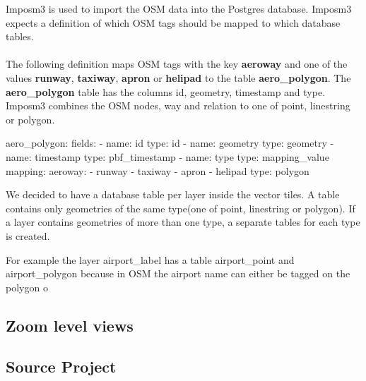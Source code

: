 Imposm3 is used to import the OSM data into the Postgres database. Imposm3 expects a definition of which OSM tags should be mapped to which database tables. \\\\
The following definition maps OSM tags with the key \textbf{aeroway} and one of the values \textbf{runway}, \textbf{taxiway}, \textbf{apron} or \textbf{helipad} to the table \textbf{aero\_polygon}. The \textbf{aero\_polygon} table has the columns id, geometry, timestamp and type. Imposm3 combines the OSM nodes, way and relation to one of point, linestring or polygon.

\begin{yamlcode}
aero_polygon:
  fields:
  - name: id
    type: id
  - name: geometry
    type: geometry
  - name: timestamp
    type: pbf_timestamp
  - name: type
    type: mapping_value
  mapping:
    aeroway:
    - runway
    - taxiway
    - apron
    - helipad
  type: polygon
\end{yamlcode}

We decided to have a database table per layer inside the vector tiles. A table contains only geometries of the same type(one of point, linestring or polygon). If a layer contains geometries of more than one type, a separate tables for each type is created.

For example the layer airport_label has a table airport_point and airport_polygon because in OSM the airport name can either be tagged on the polygon o   


\subsection{Zoom level views}


\subsection{Source Project}
